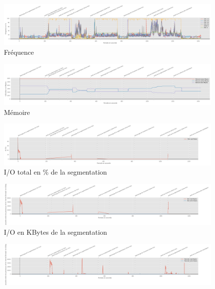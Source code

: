 {
   \clearpage 
   \newpage
   \begin{landscape}
   \begin{figure}[H]
      \centering
      \includegraphics[width=1.5\textwidth]{frequency_usage}
      \caption{Fréquence}
      \label{fig:frequency_usage}
   \end{figure}
   \begin{figure}[H]
      \centering
      \includegraphics[width=1.5\textwidth]{memory_usage}
      \caption{Mémoire}
      \label{fig:memory_usage}
   \end{figure} 
   \begin{figure}[H]
      \centering
      \includegraphics[width=1.5\textwidth]{io}
      \caption{I/O total en \% de la segmentation}
      \label{fig:io}
   \end{figure}
   \begin{figure}[H]
      \centering
      \includegraphics[width=1.5\textwidth]{io_segnetcamera}
      \caption{I/O en KBytes de la segmentation}
      \label{fig:io_segnetcamera}
   \end{figure} 
   \begin{figure}[H]
      \centering
      \includegraphics[width=1.5\textwidth]{io_totaldisk}

\end{figure}
\end{landscape}}
